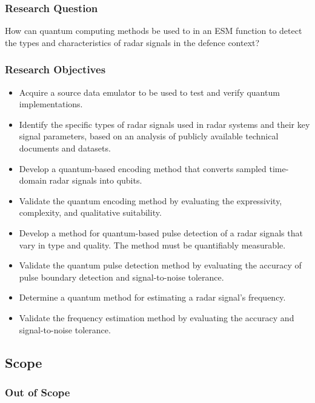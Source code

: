 \subsubsection{Research Question}
How can quantum computing methods be used to in an ESM function to detect the types and characteristics of radar signals in the defence context?

\subsubsection{Research Objectives}
\begin{itemize}
    \item Acquire a source data emulator to be used to test and verify quantum implementations.
    \item Identify the specific types of radar signals used in radar systems and their key signal parameters, based on an analysis of publicly available technical documents and datasets.
    \item Develop a quantum-based encoding method that converts sampled time-domain radar signals into qubits.
    \item Validate the quantum encoding method by evaluating the expressivity, complexity, and qualitative suitability.
    \item Develop a method for quantum-based pulse detection of a radar signals that vary in type and quality. The method must be quantifiably measurable.
    \item Validate the quantum pulse detection method by evaluating the accuracy of pulse boundary detection and signal-to-noise tolerance.
    \item Determine a quantum method for estimating a radar signal's frequency.
    \item Validate the frequency estimation method by evaluating the accuracy and signal-to-noise tolerance.
\end{itemize}

\subsection{Scope}

\subsubsection{Out of Scope}

